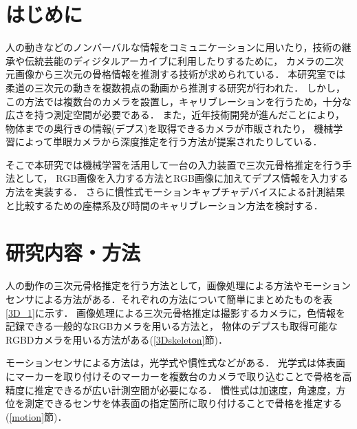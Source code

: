 \documentclass[a4j, fleqn, 12pt]{jsreport}
\begin{document}
\maketitle
\tableofcontents
\cleardoublepage
{}

\chapter{はじめに}
人の動きなどのノンバーバルな情報をコミュニケーションに用いたり，技術の継承や伝統芸能のディジタルアーカイブに利用したりするために，
カメラの二次元画像から三次元の骨格情報を推測する技術が求められている．
本研究室では柔道の三次元の動きを複数視点の動画から推測する研究\cite{turugi}が行われた．
しかし，この方法では複数台のカメラを設置し，キャリブレーションを行うため，十分な広さを持つ測定空間が必要である．
また，近年技術開発が進んだことにより，物体までの奥行きの情報(デプス)を取得できるカメラが市販されたり，
機械学習によって単眼カメラから深度推定を行う方法\cite{depth}が提案されたりしている．

そこで本研究では機械学習を活用して一台の入力装置で三次元骨格推定を行う手法として，
RGB画像を入力する方法とRGB画像に加えてデプス情報を入力する方法を実装する．
さらに慣性式モーションキャプチャデバイスによる計測結果と比較するための座標系及び時間のキャリブレーション方法を検討する．

\chapter{研究内容・方法}
人の動作の三次元骨格推定を行う方法として，画像処理による方法やモーションセンサによる方法がある．それぞれの方法について簡単にまとめたものを表\ref{3D_1}に示す．
画像処理による三次元骨格推定は撮影するカメラに，色情報を記録できる一般的なRGBカメラを用いる方法と，
物体のデプスも取得可能なRGBDカメラを用いる方法がある(\ref{3Dskeleton}節)．

モーションセンサによる方法は，光学式や慣性式などがある．
光学式は体表面にマーカーを取り付けそのマーカーを複数台のカメラで取り込むことで骨格を高精度に推定できるが広い計測空間が必要になる．
慣性式は加速度，角速度，方位を測定できるセンサを体表面の指定箇所に取り付けることで骨格を推定する(\ref{motion}節)．

\end{document}
